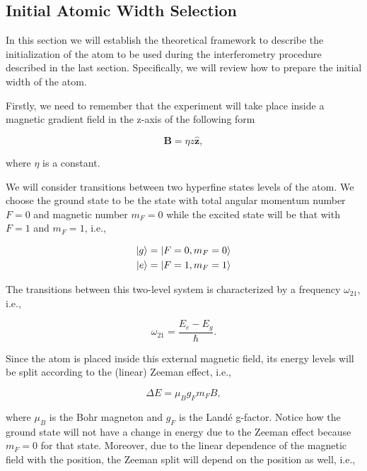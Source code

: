 \documentclass{article}
\begin{document}
\subsection{Initial Atomic Width Selection}
In this section we will establish the theoretical framework to describe the initialization of the atom to be used during the interferometry procedure described in the last section. Specifically, we will review how to prepare the initial width of the atom.

Firstly, we need to remember that the experiment will take place inside a magnetic gradient field in the z-axis of the following form

\begin{equation*}
\textbf{B} = \eta z \hat{\textbf{z}},
\end{equation*}

where $\eta$ is a constant.

We will consider transitions between two hyperfine states levels of the atom. We choose the ground state to be the state with total angular momentum number $F=0$ and magnetic number $m_{F}=0$ while the excited state will be that with $F=1$ and $m_{F}=1$, i.e.,

\begin{equation}\label{hyperfine_levels}
\begin{aligned}
\ket{g} = \ket{F=0, m_{F}=0} \\
\ket{e} = \ket{F=1, m_{F}=1}
\end{aligned}
\end{equation}

The transitions between this two-level system is characterized by a frequency  $\omega_{21}$, i.e.,

\begin{equation}
  \omega_{21} = \frac{E_{e}-E_{g}}{\hbar}.
\end{equation}

Since the atom is placed inside this external magnetic field, its energy levels will be split according to the (linear) Zeeman effect, i.e.,

\begin{equation}
  \Delta E = \mu_{B} g_{F} m_{F} B,
\end{equation}

where $\mu_{B}$ is the Bohr magneton and $g_{F}$ is the Landé g-factor. Notice how the ground state will not have a change in energy due to the Zeeman effect because $m_{F}=0$ for that state. Moreover, due to the linear dependence of the magnetic field with the position, the Zeeman split will depend on the position as well, i.e.,
\end{document}
